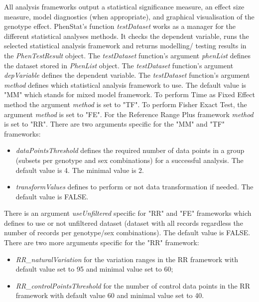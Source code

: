 \documentclass[a4paper]{article}
\begin{document}
All analysis frameworks output a statistical significance measure, an effect size measure, model diagnostics
(when appropriate), and graphical visualisation of the genotype effect.
\newline\newline
PhenStat's function \textit{testDataset} works as a manager for the different statistical analyses methods.
It checks the dependent variable, runs the selected statistical analysis framework and  returns modelling\slash
testing results in the \textit{PhenTestResult} object.
\newline\newline
The \textit{testDataset} function's argument \textit{phenList} defines the dataset stored in \textit{PhenList} object.
\newline\newline
The \textit{testDataset} function's argument \textit{depVariable} defines the dependent variable.
\newline\newline
The \textit{testDataset} function's argument \textit{method} defines which statistical analysis framework to use.
The default value is "MM" which stands for mixed model framework. To perform Time as Fixed Effect method the argument
\textit{method} is set to "TF". To perform Fisher Exact Test, the argument \textit{method} is set to "FE". For the
Reference Range Plus framework \textit{method} is set to "RR".
\newline\newline
There are two arguments specific for the "MM" and "TF" frameworks:
\begin{itemize}
\item \textit{dataPointsThreshold} defines the required number of data points in a group (subsets per genotype and sex combinations)
for a successful analysis. The default value is 4. The minimal value is 2.
\item \textit{transformValues} defines to perform or not data transformation if needed. The default value is FALSE.
\end{itemize}
There is an argument \textit{useUnfiltered} specific for "RR" and "FE" frameworks which defines
to use or not unfiltered dataset (dataset with all records regardless the number
of records per genotype/sex combinations). The default value is FALSE.
\newline\newline
There are two more arguments specific for the "RR" framework:
\begin{itemize}
\item \textit{RR\_naturalVariation} for the variation ranges in the RR framework with default value set to 95
and minimal value set to 60;
\item \textit{RR\_controlPointsThreshold} for the number of control data points in the RR framework with default
value 60 and minimal value set to 40.
\end{itemize}
\end{document}
